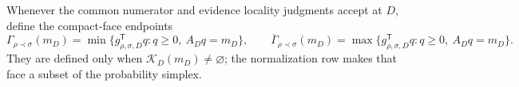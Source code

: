 Whenever the common numerator and evidence locality judgments accept at \(D\), define the compact-face endpoints
\[
\Gamma_{\rho\prec\sigma}(m_D)=
\min\{g_{\rho,\sigma,D}^{\mathsf T}q:q\geq0,\ A_Dq=m_D\},
\qquad
\overline\Gamma_{\rho\prec\sigma}(m_D)=
\max\{g_{\rho,\sigma,D}^{\mathsf T}q:q\geq0,\ A_Dq=m_D\}.
\]
They are defined only when \(\mathcal K_D(m_D)\ne\varnothing\); the normalization row makes that face a subset of the probability simplex.